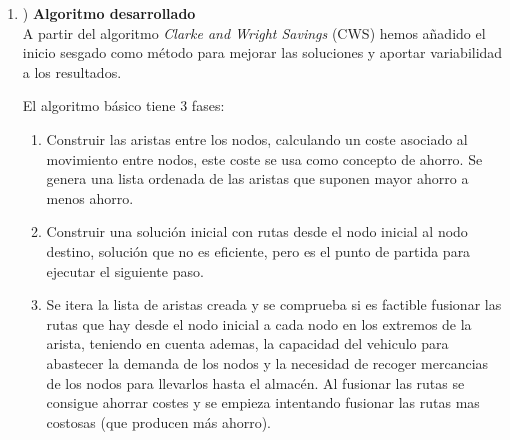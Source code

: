 \documentclass[11pt]{article} %
\begin{document}
\begin{enumerate}
   \item) \textbf{Algoritmo desarrollado}\\[0.2cm]
A partir del algoritmo \textit{Clarke and Wright Savings} (CWS) hemos añadido el inicio sesgado como método para mejorar las soluciones y aportar variabilidad a los resultados.

El algoritmo básico tiene 3 fases:
\renewcommand{\labelenumii}{\arabic{enumii}}
	\begin{enumerate}
		\item Construir las aristas entre los nodos, calculando un coste asociado al movimiento entre nodos, este coste se usa como concepto de ahorro. Se genera una lista ordenada de las aristas que suponen mayor ahorro a menos ahorro.
		\item Construir una solución inicial con rutas desde el nodo inicial al nodo destino, solución que no es eficiente, pero es el punto de partida para ejecutar el siguiente paso.
		\item Se itera la lista de aristas creada y se comprueba si es factible fusionar las rutas que hay desde el nodo inicial a cada nodo en los extremos de la arista, teniendo en cuenta ademas, la capacidad del vehiculo para abastecer la demanda de los nodos y la necesidad de recoger mercancias de los nodos para llevarlos hasta el almacén. Al fusionar las rutas se consigue ahorrar costes y se empieza intentando fusionar las rutas mas costosas (que producen más ahorro).
	\end{enumerate}


\end{enumerate}
\end{document}
